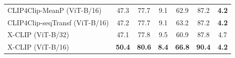 \documentclass[sigconf]{acmart}
\begin{document}
\begin{table}[]
{\begin{tabular}{l|ccc|ccc}
CLIP4Clip-MeanP (ViT-B/16) \cite{luo2021clip4clip} & 47.3 & 77.7 & 9.1 & 62.9 & 87.2 & \textbf{4.2} \\ 
CLIP4Clip-seqTransf (ViT-B/16) \cite{luo2021clip4clip}   & 47.2 & 77.7 & 9.1 & 63.2 & 87.2 & \textbf{4.2}  \\
\hline
X-CLIP (ViT-B/32)    & 47.1          & 77.8          & 9.5          & 60.9          & 87.8          & 4.7          \\
X-CLIP (ViT-B/16)    & \textbf{50.4} & \textbf{80.6} & \textbf{8.4} & \textbf{66.8} & \textbf{90.4} & \textbf{4.2} \\ \hline
\end{tabular}
}
\vspace{-0.2cm}
\label{tab:msvd_performance}
\end{table}
\end{document}
